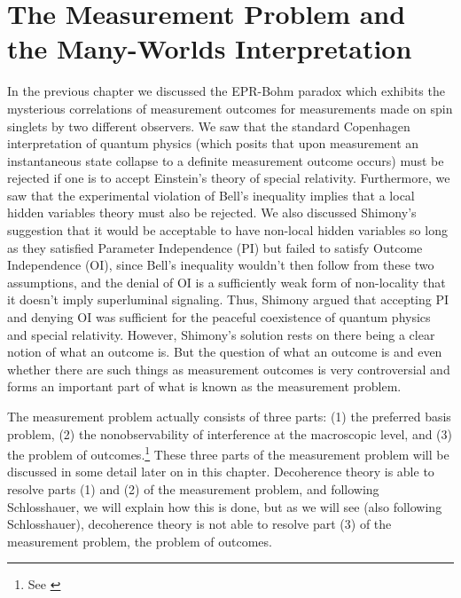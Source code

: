\documentclass[12pt]{report}
\begin{document}
\chapter{The Measurement Problem and the Many-Worlds Interpretation\label{measprobchap}}
In the previous chapter we discussed the EPR-Bohm paradox which exhibits the mysterious correlations of measurement outcomes for measurements  made on spin singlets by two different observers. We saw that the standard Copenhagen interpretation of quantum physics (which posits that upon measurement  an instantaneous state collapse to a definite measurement outcome occurs) must be rejected if one is to accept Einstein's theory of special relativity. Furthermore, we saw that the experimental violation of Bell's inequality implies that a local hidden variables theory must also be rejected. We also discussed Shimony's  suggestion that it would be acceptable to have non-local hidden variables so long as they satisfied Parameter Independence (PI) but failed to satisfy Outcome Independence (OI), since Bell's inequality wouldn't then follow from these two assumptions, and the denial of OI is a sufficiently weak form of non-locality that it doesn't imply superluminal signaling. Thus, Shimony argued that accepting PI and denying OI was sufficient for the peaceful coexistence of quantum physics and special relativity. However, Shimony's solution rests on there being a clear notion of what an outcome is. But the question of what an outcome is and even whether there are such things as measurement outcomes is very controversial and forms an important part of what is known as the measurement problem.   

The measurement problem actually consists of three parts: (1) the preferred basis problem, (2) the nonobservability of interference at the macroscopic level, and (3) the problem of outcomes.\footnote{See \cite[50]{Schlosshauer}} 
These three parts of the measurement problem will be discussed in some detail later on in this chapter. Decoherence theory is able to resolve parts (1) and (2) of the measurement problem, and following Schlosshauer, we will explain how this is done, but as we will see (also following Schlosshauer), decoherence theory is not able to resolve part (3) of the measurement problem, the problem of outcomes.
\end{document}
